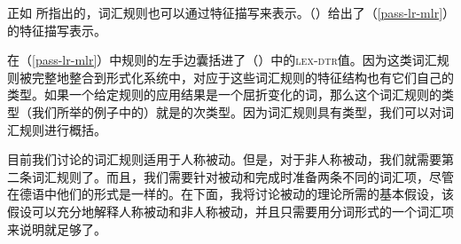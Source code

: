 正如 \citet{Meurers2001a}所指出的，词汇规则也可以通过特征描写来表示。\label{pageref-lr-mit-dtr}（）给出了（\ref{pass-lr-mlr}）的特征描写表示。
\begin{figure}
\ea
\label{passiv-lr-mit-dtr}
\z
\vspace{-\baselineskip}
\end{figure}%
在（\ref{pass-lr-mlr}）中规则的左手边囊括进了（）中的\textsc{lex-dtr}值。因为这类词汇规则被完整地整合到形式化系统中，对应于这些词汇规则的特征结构也有它们自己的类型。如果一个给定规则的应用结果是一个屈折变化的词，那么这个词汇规则的类型（我们所举的例子中的）就是的次类型。因为词汇规则具有类型，我们可以对词汇规则进行概括。

目前我们讨论的词汇规则适用于人称被动。但是，对于非人称被动，我们就需要第二条词汇规则了。而且，我们需要针对被动和完成时准备两条不同的词汇项，尽管在德语中他们的形式是一样的。在下面，我将讨论被动的理论所需的基本假设，该假设可以充分地解释人称被动和非人称被动，并且只需要用分词形式的一个词汇项来说明就足够了。

